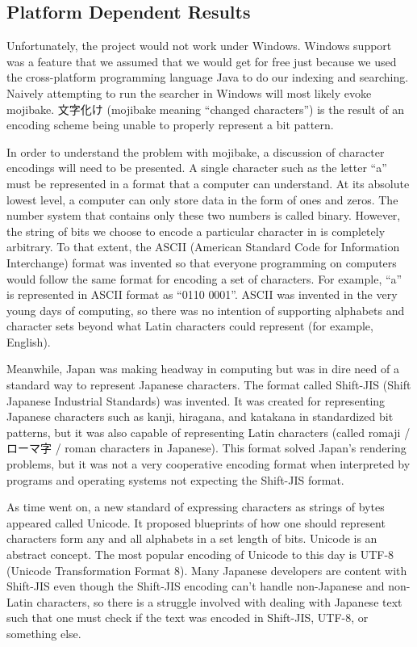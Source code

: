\documentclass{acm} %
\begin{document}
\begin{CJK}{UTF8}{zhsong}

\subsection{Platform Dependent Results}

Unfortunately, the project would not work under Windows. Windows support was a feature that we assumed that we would get for free just because we used the cross-platform programming language Java to do our indexing and searching. Naively attempting to run the searcher in Windows will most likely evoke mojibake. 文字化け (mojibake meaning ``changed characters'') is the result of an encoding scheme being unable to properly represent a bit pattern.

In order to understand the problem with mojibake, a discussion of character encodings will need to be presented. A single character such as the letter ``a'' must be represented in a format that a computer can understand. At its absolute lowest level, a computer can only store data in the form of ones and zeros. The number system that contains only these two numbers is called binary. However, the string of bits we choose to encode a particular character in is completely arbitrary. To that extent, the ASCII (American Standard Code for Information Interchange) format was invented so that everyone programming on computers would follow the same format for encoding a set of characters. For example, ``a'' is represented in ASCII format as ``0110 0001''. ASCII was invented in the very young days of computing, so there was no intention of supporting alphabets and character sets beyond what Latin characters could represent (for example, English).

Meanwhile, Japan was making headway in computing but was in dire need of a standard way to represent Japanese characters. The format called Shift-JIS (Shift Japanese Industrial Standards) was invented. It was created for representing Japanese characters such as kanji, hiragana, and katakana in standardized bit patterns, but it was also capable of representing Latin characters (called romaji / ローマ字 / roman characters in Japanese). This format solved Japan's rendering problems, but it was not a very cooperative encoding format when interpreted by programs and operating systems not expecting the Shift-JIS format.

As time went on, a new standard of expressing characters as strings of bytes appeared called Unicode. It proposed blueprints of how one should represent characters form any and all alphabets in a set length of bits. Unicode is an abstract concept. The most popular encoding of Unicode to this day is UTF-8 (Unicode Transformation Format 8). Many Japanese developers are content with Shift-JIS even though the Shift-JIS encoding can't handle non-Japanese and non-Latin characters, so there is a struggle involved with dealing with Japanese text such that one must check if the text was encoded in Shift-JIS, UTF-8, or something else.


\end{CJK}
\end{document}
